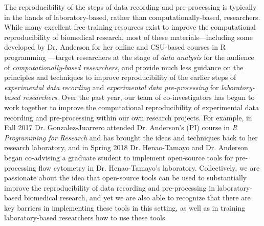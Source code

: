 \documentclass[pdftex,english,11.5pt,parskip=half]{scrartcl}
\begin{document}
The reproducibility of the steps of data recording and pre-processing is typically 
in the hands of laboratory-based, rather than computationally-based, researchers.
While many excellent free training resources exist to improve the computational
reproducibility of biomedical research, most of these
materials---including some developed by Dr. Anderson for her online and
CSU-based courses in R programming \cite{andersoncoursebook, andersonmastering}---target researchers at the stage of
\textit{data analysis} for the audience of \textit{computationally-based researchers}, and provide much less guidance on the principles and
techniques to improve reproducibility of the earlier steps of
\textit{experimental data recording} and \textit{experimental data
pre-processing} for \textit{laboratory-based researchers}. 
Over the past year, our team of co-investigators has begun
to work together to improve the computational reproducibility of experimental data recording and pre-processing within our own research projects. For example, in
Fall 2017 Dr. Gonzalez-Juarrero attended Dr. Anderson's (PI) course in \textit{R
Programming for Research} and has brought the ideas and techniques back to her
research laboratory, and in Spring 2018 Dr. Henao-Tamayo and Dr.
Anderson began co-advising a graduate student to implement
open-source tools for pre-processing flow cytometry in Dr. Henao-Tamayo's
laboratory. Collectively, we are passionate about the idea that
open-source tools can be used to substantially improve the
reproducibility of data recording and pre-processing in laboratory-based
biomedical research, and yet we are also able to recognize that there are key barriers in
implementing these tools in this setting, as well as in training
laboratory-based researchers how to use these tools. 
\end{document}

